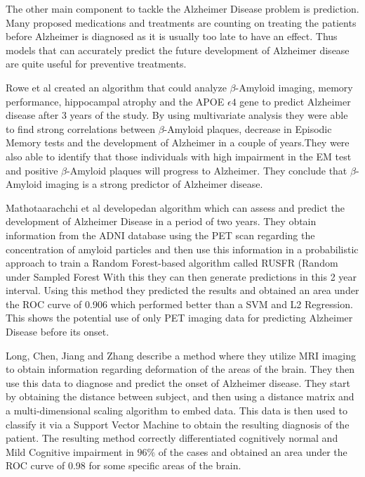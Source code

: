 The other main component to tackle the Alzheimer Disease problem is prediction. Many proposed medications and treatments are counting on treating the patients before Alzheimer is diagnosed as it is usually too late to have an effect. Thus models that can accurately predict the future development of Alzheimer disease are quite useful for preventive treatments.

Rowe et al created\cite{Rowe2013} an algorithm that could analyze $\beta$-Amyloid imaging, memory performance, hippocampal atrophy and the APOE $\epsilon4$ gene to predict Alzheimer disease after 3 years of the study. By using multivariate analysis they were able to find strong correlations between $\beta$-Amyloid plaques, decrease in Episodic Memory tests and the development of Alzheimer in a couple of years.They were also able to identify that those individuals with high impairment in the EM test and positive $\beta$-Amyloid plaques will progress to Alzheimer. They conclude that $\beta$-Amyloid imaging is a strong predictor of Alzheimer disease.

Mathotaarachchi et al developed\cite{Mathotaarachchi2017a}an algorithm which can assess and predict the development of Alzheimer Disease in a period of two years. They obtain information from the ADNI database using the PET scan regarding the concentration of amyloid particles and then use this information in a probabilistic approach to train a Random Forest-based algorithm called RUSFR (Random under Sampled Forest With this they can then generate predictions in this 2 year interval. Using this method they predicted the results and obtained an area under the ROC curve of 0.906 which performed better than a SVM and L2 Regression. This shows the potential use of only PET imaging data for predicting Alzheimer Disease before its onset.

Long, Chen, Jiang and Zhang describe\cite{Long2017} a method where they utilize MRI imaging to obtain information regarding deformation of the areas of the brain. They then use this data to diagnose and predict the onset of Alzheimer disease. They start by obtaining the distance between subject, and then using a distance matrix and a multi-dimensional scaling algorithm to embed data. This data is then used to classify it via a Support Vector Machine to obtain the resulting diagnosis of the patient. The resulting method correctly differentiated cognitively normal and Mild Cognitive impairment in $96\%$ of the cases and obtained an area under the ROC curve of 0.98 for some specific areas of the brain.
